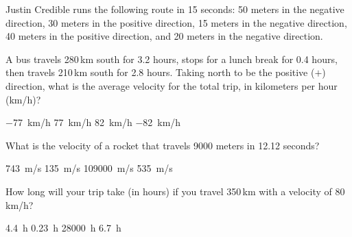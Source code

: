 \documentclass[answers]{exam}
\begin{document}
\begin{questions}
\question
Justin Credible runs the following route in 15 seconds: 50 meters in the negative direction, 30 meters in the positive direction, 15 meters in the negative direction, 40 meters in the positive direction, and 20 meters in the negative direction.


\question
A bus travels 280\,km south for 3.2 hours, stops for a lunch break for 0.4 hours, then travels 210\,km south for 2.8 hours. Taking north to be the positive ($+$) direction, what is the average velocity for the total trip, in kilometers per hour (km/h)?

\begin{randomizechoices}
    \correctchoice \SI{-77}{km/h}
    \choice \SI{77}{km/h}
    \choice \SI{82}{km/h}
    \choice \SI{-82}{km/h}
\end{randomizechoices}

\question
What is the velocity of a rocket that travels 9000 meters in 12.12 seconds?

\begin{randomizechoices}
    \correctchoice \SI{743}{m/s}
    \choice \SI{135}{m/s}
    \choice \SI{109000}{m/s}
    \choice \SI{535}{m/s}
\end{randomizechoices}

\question
How long will your trip take (in hours) if you travel 350\,km with a velocity of 80\,km/h?

\begin{randomizechoices}
    \correctchoice \SI{4.4}{h}
    \choice \SI{0.23}{h}
    \choice \SI{28000}{h}
    \choice \SI{6.7}{h}
\end{randomizechoices}


\end{questions}
\end{document}
